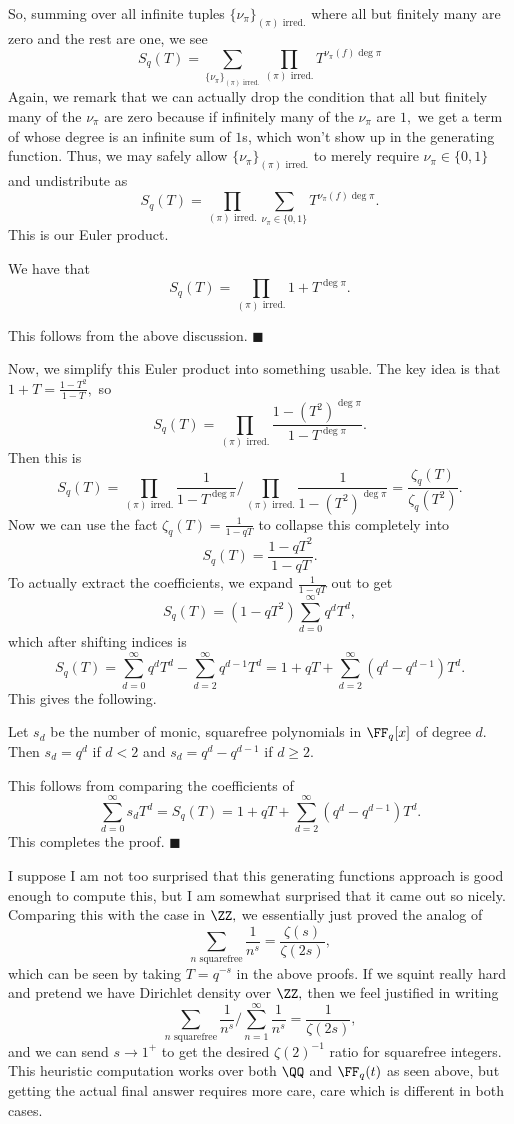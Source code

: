 So, summing over all infinite tuples $\{\nu_\pi\}_{(\pi)\text{ irred.}}$ where all but finitely many are zero and the rest are one, we see
\[S_q(T)=\sum_{\{\nu_\pi\}_{(\pi)\text{ irred.}}}\prod_{(\pi)\text{ irred.}}T^{\nu_\pi(f)\deg\pi}\]
Again, we remark that we can actually drop the condition that all but finitely many of the $\nu_\pi$ are zero because if infinitely many of the $\nu_\pi$ are $1,$ we get a term of whose degree is an infinite sum of $1$s, which won't show up in the generating function. Thus, we may safely allow $\{\nu_\pi\}_{(\pi)\text{ irred.}}$ to merely require $\nu_\pi\in\{0,1\}$ and undistribute as
\[S_q(T)=\prod_{(\pi)\text{ irred.}}\sum_{\nu_\pi\in\{0,1\}}T^{\nu_\pi(f)\deg\pi}.\]
This is our Euler product.
\begin{lemma}
    We have that
    \[S_q(T)=\prod_{(\pi)\text{ irred.}}1+T^{\deg\pi}.\]
\end{lemma}
This follows from the above discussion. $\blacksquare$

Now, we simplify this Euler product into something usable. The key idea is that $1+T=\frac{1-T^2}{1-T},$ so
\[S_q(T)=\prod_{(\pi)\text{ irred.}}\frac{1-(T^2)^{\deg\pi}}{1-T^{\deg\pi}}.\]
Then this is
\[S_q(T)=\prod_{(\pi)\text{ irred.}}\frac1{1-T^{\deg\pi}}\Bigg/\prod_{(\pi)\text{ irred.}}\frac1{1-(T^2)^{\deg\pi}}=\frac{\zeta_q(T)}{\zeta_q\left(T^2\right)}.\]
Now we can use the fact $\zeta_q(T)=\frac1{1-qT}$ to collapse this completely into
\[S_q(T)=\frac{1-qT^2}{1-qT}.\]
To actually extract the coefficients, we expand $\frac1{1-qT}$ out to get
\[S_q(T)=\left(1-qT^2\right)\sum_{d=0}^\infty q^dT^d,\]
which after shifting indices is
\[S_q(T)=\sum_{d=0}^\infty q^dT^d-\sum_{d=2}^\infty q^{d-1}T^d=1+qT+\sum_{d=2}^\infty\left(q^d-q^{d-1}\right)T^d.\]
This gives the following.
\begin{theorem}
    Let $s_d$ be the number of monic, squarefree polynomials in $\FF_q[x]$ of degree $d.$ Then $s_d=q^d$ if $d<2$ and $s_d=q^d-q^{d-1}$ if $d\ge2.$
\end{theorem}
This follows from comparing the coefficients of
\[\sum_{d=0}^\infty s_dT^d=S_q(T)=1+qT+\sum_{d=2}^\infty\left(q^d-q^{d-1}\right)T^d.\]
This completes the proof. $\blacksquare$

I suppose I am not too surprised that this generating functions approach is good enough to compute this, but I am somewhat surprised that it came out so nicely. Comparing this with the case in $\ZZ,$ we essentially just proved the analog of
\[\sum_{n\text{ squarefree}}\frac1{n^s}=\frac{\zeta(s)}{\zeta(2s)},\]
which can be seen by taking $T=q^{-s}$ in the above proofs. If we squint really hard and pretend we have Dirichlet density over $\ZZ,$ then we feel justified in writing
\[\sum_{n\text{ squarefree}}\frac1{n^s}\Bigg/\sum_{n=1}^\infty\frac1{n^s}=\frac1{\zeta(2s)},\]
and we can send $s\to1^+$ to get the desired $\zeta(2)^{-1}$ ratio for squarefree integers. This heuristic computation works over both $\QQ$ and $\FF_q(t)$ as seen above, but getting the actual final answer requires more care, care which is different in both cases.

